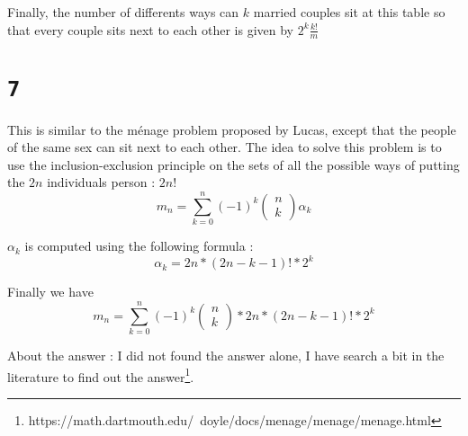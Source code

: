 \documentclass[a4paper,11pt]{report}
\begin{document}
Finally, the number of differents ways can $k$ married couples sit at this table
so that every couple sits next to each other is given by $2^k\frac{k!}{m}$

\section*{\texttt{7}}

This is similar to the m\'{e}nage problem proposed by Lucas, except that the
people of the same sex can sit next to each other. The idea to solve this
problem is to use the inclusion-exclusion principle on the sets of all the
possible ways of putting the $2n$ individuals person : $2n!$
$$
m_n = \sum_{k=0}^n (-1)^k \begin{pmatrix} n \\ k\end{pmatrix} \alpha_k
$$

$\alpha_k$ is computed using the following formula :
$$
\alpha_k = 2n * (2n-k-1)! * 2^k
$$

Finally we have
$$
m_n = \sum_{k=0}^n (-1)^k \begin{pmatrix} n \\ k\end{pmatrix} * 2n * (2n-k-1)! * 2^k
$$

About the answer : I did not found the answer alone, I have search a bit in the
literature to find out the answer\footnote{https://math.dartmouth.edu/~doyle/docs/menage/menage/menage.html}.
\end{document}
